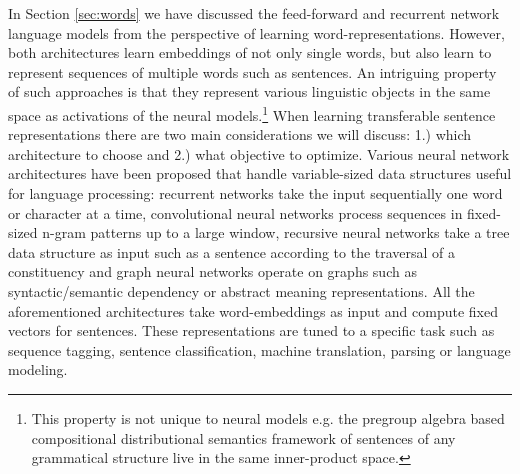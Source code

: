 In Section \ref{sec:words} we have discussed the feed-forward \citep{bengio2003neural}
and recurrent network \citep{mikolov2010recurrent} language models from the perspective
of learning word-representations. However, both architectures learn embeddings of not only single words,
but also learn to represent sequences of multiple words such as sentences.
An intriguing property of such approaches is that
they represent various linguistic objects in the same space as activations of the neural models.\footnote{This property is not unique to neural models e.g. the pregroup algebra based compositional distributional
semantics framework of \cite{coecke2010mathematical}
sentences of any grammatical structure live in the same inner-product space.}
When learning transferable
sentence representations there are two main considerations we will discuss:
1.) which architecture to choose and 2.) what objective to optimize.
Various neural network architectures have been proposed that
handle variable-sized data structures useful for language processing: recurrent networks
take the input sequentially one word or character at a time,
convolutional neural networks
\citep{kalchbrenner2014convolutional,zhang2015character,conneau2016very,chen2013learning}
process sequences in fixed-sized n-gram patterns up to a large window,
recursive neural networks \citep{goller1996learning,socher2011parsing,kai2015treelstm}
take a tree data structure as input such as a sentence according to the traversal of a
constituency and graph neural networks operate on graphs \citep{marcheggiani2017encoding} such as
syntactic/semantic dependency or abstract meaning representations.
All the aforementioned architectures take word-embeddings as input
and compute fixed vectors for sentences.
These representations are tuned to a specific task such as sequence tagging,
sentence classification, machine translation, parsing or language modeling.


